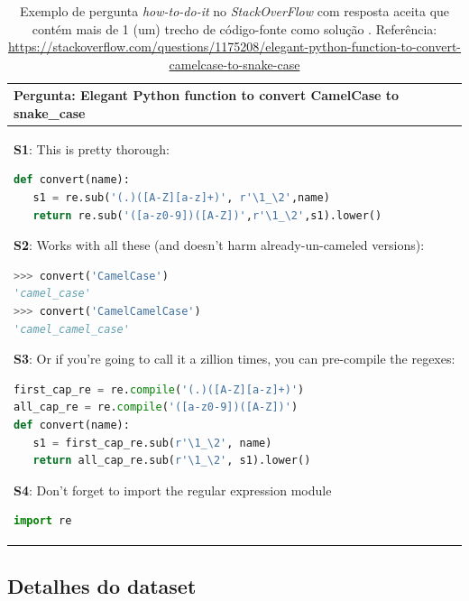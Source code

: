 \begin{table}[h!]
\centering
\begin{tabular}{ |p{14cm}| } 
 \hline
\textbf{Pergunta:} Elegant Python function to
convert CamelCase to snake\_case \\ \hline
\textbf{S1}: This is pretty thorough:

\begin{lstlisting}[language=python, caption={C1}]
 def convert(name):
   s1 = re.sub('(.)([A-Z][a-z]+)', r'\1_\2',name)
   return re.sub('([a-z0-9])([A-Z])',r'\1_\2',s1).lower()
\end{lstlisting}

\textbf{S2}: Works with all these (and doesn't harm already-un-cameled versions):

\begin{lstlisting}[language=python, caption={C2}]
 >>> convert('CamelCase')
'camel_case'
>>> convert('CamelCamelCase')
'camel_camel_case'
\end{lstlisting}

\textbf{S3}: Or if you're going to call it a zillion times, you can pre-compile the regexes:

\begin{lstlisting}[language=python, caption={C3}]
first_cap_re = re.compile('(.)([A-Z][a-z]+)')
all_cap_re = re.compile('([a-z0-9])([A-Z])')
def convert(name):
   s1 = first_cap_re.sub(r'\1_\2', name)
   return all_cap_re.sub(r'\1_\2', s1).lower()
\end{lstlisting}

\textbf{S4}: Don't forget to import the regular expression module
\begin{lstlisting}[language=python, caption={C4}]
import re
\end{lstlisting}

 \\ 
 \hline
\end{tabular}
\caption{Exemplo de pergunta \textit{how-to-do-it} no \textit{StackOverFlow} com resposta aceita que contém mais de 1 (um) trecho de código-fonte como solução \cite{yao-2018}. Referência: \url{https://stackoverflow.com/questions/1175208/elegant-python-function-to-convert-camelcase-to-snake-case}}
\label{table:exemplo-pergunta-stack-over-flow-how-to-do-it}
\end{table}




\subsection{Detalhes do dataset}

